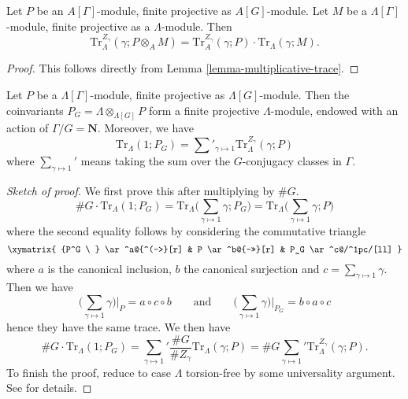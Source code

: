 \begin{lemma}
\label{lemma-weak-trace}
Let $P$ be an $A[\Gamma]$-module, finite projective as $A[G]$-module. Let $M$
be a $\Lambda[\Gamma]$-module, finite projective as a $\Lambda$-module. Then
$$
\text{Tr}_{\Lambda}^{Z_\gamma}(\gamma; P \otimes_A M) = \text{Tr}_A^{Z_\gamma}
(\gamma;P)\cdot \text{Tr}_\Lambda(\gamma; M).
$$
\end{lemma}

\begin{proof}
This follows directly from Lemma \ref{lemma-multiplicative-trace}.
\end{proof}

\begin{lemma}
\label{lemma-trivial-trace}
Let $P$ be a $\Lambda[\Gamma]$-module, finite projective as
$\Lambda[G]$-module. Then the coinvariants
$P_G = \Lambda \otimes_{\Lambda[G]} P$
form a finite projective $\Lambda$-module, endowed with an action of
$\Gamma/G = \mathbf{N}$. Moreover, we have
$$
\text{Tr}_\Lambda(1; P_G) =
\sum\nolimits'_{\gamma \mapsto 1} \text{Tr}_\Lambda^{Z_\gamma}(\gamma; P)
$$
where $\sum_{\gamma\mapsto 1}'$ means taking the sum over the $G$-conjugacy
classes in $\Gamma$.
\end{lemma}

\begin{proof}[Sketch of proof]
We first prove this after multiplying by $\#G$.
$$
\# G\cdot \text{Tr}_\Lambda(1; P_G)
= \text{Tr}_\Lambda\bigg(\sum_{\gamma\mapsto 1} \gamma; P_G\bigg)
= \text{Tr}_\Lambda\bigg(\sum_{\gamma\mapsto 1} \gamma; P\bigg)
$$
where the second equality follows by considering the commutative triangle
$$
\xymatrix{
{P^G \ } \ar^a@{^(->}[r] & P \ar^b@{->>}[r] & P_G \ar^c@/^1pc/[ll]
}
$$
where $a$ is the canonical inclusion, $b$ the canonical surjection and $c =
\sum_{\gamma \mapsto 1} \gamma$. Then we have
$$
\bigg(\sum_{\gamma \mapsto 1} \gamma\bigg) \bigg|_P = a \circ c \circ b
\qquad \text{and} \qquad
\bigg(\sum_{\gamma \mapsto 1} \gamma\bigg) \bigg|_{P_G} = b \circ a \circ c
$$
hence they have the same trace. We then have
$$
\# G\cdot \text{Tr}_\Lambda(1; P_G)
=
{\sum_{\gamma\mapsto 1}}' \frac{\# G}{\# Z_\gamma}\text{Tr}_\Lambda(\gamma;P)
= \# G{\sum_{\gamma\mapsto 1}}' \text{Tr}_\Lambda^{Z_\gamma}(\gamma; P).
$$
To finish the proof, reduce to case $\Lambda$ torsion-free by some universality
argument. See \cite{SGA4.5} for details.
\end{proof}

